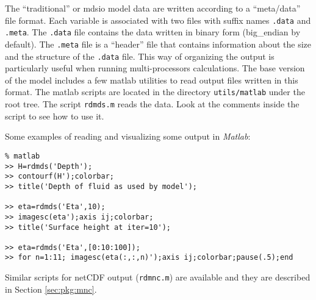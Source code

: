 The ``traditional'' or mdsio model data are written according to a
``meta/data'' file format.  Each variable is associated with two files
with suffix names \texttt{.data} and \texttt{.meta}. The
\texttt{.data} file contains the data written in binary form
(big\_endian by default). The \texttt{.meta} file is a ``header'' file
that contains information about the size and the structure of the
\texttt{.data} file. This way of organizing the output is particularly
useful when running multi-processors calculations. The base version of
the model includes a few matlab utilities to read output files written
in this format. The matlab scripts are located in the directory
\texttt{utils/matlab} under the root tree. The script \texttt{rdmds.m}
reads the data. Look at the comments inside the script to see how to
use it.

Some examples of reading and visualizing some output in {\em Matlab}:
\begin{verbatim}
% matlab
>> H=rdmds('Depth');
>> contourf(H');colorbar;
>> title('Depth of fluid as used by model');

>> eta=rdmds('Eta',10);
>> imagesc(eta');axis ij;colorbar;
>> title('Surface height at iter=10');

>> eta=rdmds('Eta',[0:10:100]);
>> for n=1:11; imagesc(eta(:,:,n)');axis ij;colorbar;pause(.5);end
\end{verbatim}

Similar scripts for netCDF output (\texttt{rdmnc.m}) are available and
they are described in Section \ref{sec:pkg:mnc}.

